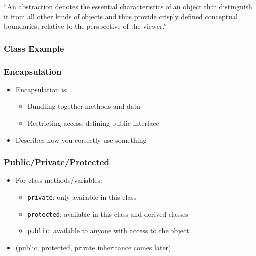 ``An abstraction denotes the essential characteristics of an object that
distinguish it from all other kinds of objects and thus provide crisply
defined conceptual boundaries, relative to the perspective of the
viewer.''

\hypertarget{class-example}{%
\subsubsection{Class Example}\label{class-example}}

\begin{Shaded}
\begin{Highlighting}[]
\NormalTok{:}
\NormalTok{\};}

\NormalTok{\{}
\NormalTok{\}}
\end{Highlighting}
\end{Shaded}

\hypertarget{encapsulation}{%
\subsubsection{Encapsulation}\label{encapsulation}}

\begin{itemize}
\tightlist
\item
  Encapsulation is:

  \begin{itemize}
  \tightlist
  \item
    Bundling together methods and data
  \item
    Restricting access, defining public interface
  \end{itemize}
\item
  Describes how you correctly use something
\end{itemize}

\hypertarget{publicprivateprotected}{%
\subsubsection{Public/Private/Protected}\label{publicprivateprotected}}

\begin{itemize}
\tightlist
\item
  For class methods/variables:

  \begin{itemize}
  \tightlist
  \item
    \texttt{private}: only available in this class
  \item
    \texttt{protected}: available in this class and derived classes
  \item
    \texttt{public}: available to anyone with access to the object
  \end{itemize}
\item
  (public, protected, private inheritance comes later)
\end{itemize}

